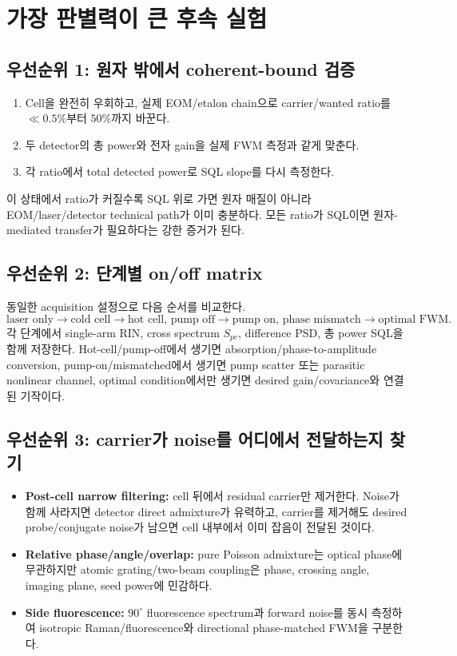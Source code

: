 \documentclass[11pt,a4paper]{article}
\begin{document}
\section{가장 판별력이 큰 후속 실험}

\subsection{우선순위 1: 원자 밖에서 coherent-bound 검증}

\begin{enumerate}
\item Cell을 완전히 우회하고, 실제 EOM/etalon chain으로 carrier/wanted ratio를
$\ll0.5\%$부터 $50\%$까지 바꾼다.
\item 두 detector의 총 power와 전자 gain을 실제 FWM 측정과 같게 맞춘다.
\item 각 ratio에서 total detected power로 SQL slope를 다시 측정한다.
\end{enumerate}
이 상태에서 ratio가 커질수록 SQL 위로 가면 원자 매질이 아니라 EOM/laser/detector
technical path가 이미 충분하다. 모든 ratio가 SQL이면 원자-mediated transfer가
필요하다는 강한 증거가 된다.

\subsection{우선순위 2: 단계별 on/off matrix}

동일한 acquisition 설정으로 다음 순서를 비교한다.
\begin{equation*}
\text{laser only}\rightarrow
\text{cold cell}\rightarrow
\text{hot cell, pump off}\rightarrow
\text{pump on, phase mismatch}\rightarrow
\text{optimal FWM}.
\end{equation*}
각 단계에서 single-arm RIN, cross spectrum $S_{pc}$, difference PSD, 총 power SQL을
함께 저장한다. Hot-cell/pump-off에서 생기면 absorption/phase-to-amplitude conversion,
pump-on/mismatched에서 생기면 pump scatter 또는 parasitic nonlinear channel,
optimal condition에서만 생기면 desired gain/covariance와 연결된 기작이다.

\subsection{우선순위 3: carrier가 noise를 어디에서 전달하는지 찾기}

\begin{itemize}
\item \textbf{Post-cell narrow filtering:} cell 뒤에서 residual carrier만 제거한다.
Noise가 함께 사라지면 detector direct admixture가 유력하고, carrier를 제거해도 desired
probe/conjugate noise가 남으면 cell 내부에서 이미 잡음이 전달된 것이다.
\item \textbf{Relative phase/angle/overlap:} pure Poisson admixture는 optical phase에
무관하지만 atomic grating/two-beam coupling은 phase, crossing angle, imaging plane,
seed power에 민감하다.
\item \textbf{Side fluorescence:} $90^\circ$ fluorescence spectrum과 forward noise를
동시 측정하여 isotropic Raman/fluorescence와 directional phase-matched FWM을 구분한다.
\end{itemize}
\end{document}
